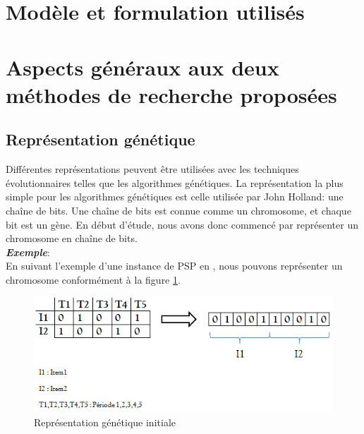 \documentclass[12pt,a4paper]{article}
\begin{document}
	\section{Modèle et formulation utilisés}
	
	\section{Aspects généraux aux deux méthodes de recherche proposées}
	\subsection{Représentation génétique}
	Différentes représentations peuvent être utilisées avec les techniques évolutionnaires telles que les algorithmes génétiques. La représentation la plus simple pour les algorithmes génétiques est celle utilisée par John Holland: une chaîne de bits. Une chaîne de bits est connue comme un chromosome, et chaque bit est un gène. En début d'étude, nous avons donc commencé par représenter un chromosome en chaîne de bits. \\
	\textsl{\textbf{Exemple}}:\\
	\hspace*{.5cm} En suivant l'exemple d'une instance de PSP en \pageref{sec:problem_description}, nous pouvons représenter un chromosome conformément à la figure \ref{fig:init_gene_repr}.
	
	\begin{figure}[h]
		\begin{center}
			\includegraphics[scale=.5]{img/init_gene_repr.png}
			\caption{Représentation génétique initiale}
			\label{fig:init_gene_repr}
		\end{center}
	\end{figure}
	
\end{document}
